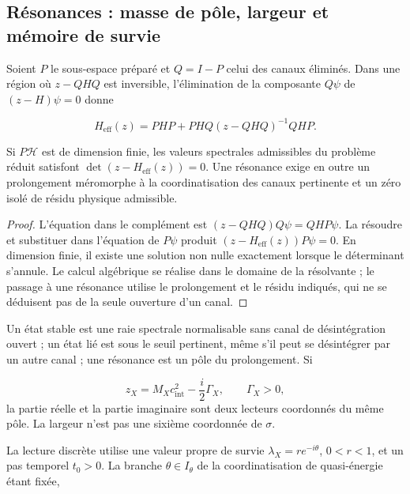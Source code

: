\subsection{Résonances : masse de pôle, largeur et mémoire de survie
}
\label{vi:subsec:resonancias-familias}

Soient \(P\) le sous-espace préparé et \(Q=I-P\) celui des canaux
éliminés. Dans une région où \(z-QHQ\) est inversible, l’élimination
de la composante \(Q\psi\) de \((z-H)\psi=0\) donne

\begin{equation}
 H_{\mathrm{eff}}(z)=PHP+PHQ(z-QHQ)^{-1}QHP.
 \label{vi:eq:feshbach-familias}
\end{equation}

\begin{proposition}
\label{vi:prop:feshbach-familias}
Si \(P\mathcal H\) est de dimension finie, les valeurs spectrales
admissibles du problème réduit satisfont
\(\det(z-H_{\mathrm{eff}}(z))=0\). Une résonance exige en outre
un prolongement méromorphe à la coordinatisation des canaux pertinente et un zéro
isolé de résidu physique admissible.

\end{proposition}
\begin{proof}
L’équation dans le complément est
\((z-QHQ)Q\psi=QHP\psi\). La résoudre et substituer dans l’équation
de \(P\psi\) produit \((z-H_{\mathrm{eff}}(z))P\psi=0\).
En dimension finie, il existe une solution non nulle exactement lorsque
le déterminant s’annule. Le calcul algébrique se réalise dans le domaine
de la résolvante ; le passage à une résonance utilise le prolongement et le
résidu indiqués, qui ne se déduisent pas de la seule ouverture d’un canal.

\end{proof}

Un état stable est une raie spectrale normalisable sans canal de
désintégration ouvert ; un état lié est sous le seuil
pertinent, même s’il peut se désintégrer par un autre canal ; une résonance est un
pôle du prolongement. Si

\[
 z_X=M_Xc_{\mathrm{int}}^2-\frac{i}{2}\Gamma_X,
 \qquad\Gamma_X>0,
\]
la partie réelle et la partie imaginaire sont deux lecteurs coordonnés du même
pôle. La largeur n’est pas une sixième coordonnée de \(\sigma\).


La lecture discrète utilise une valeur propre de survie
\(\lambda_X=re^{-i\theta}\), \(0<r<1\), et un pas temporel
\(t_0>0\). La branche \(\theta\in I_\theta\) de la coordinatisation de
quasi-énergie étant fixée,

